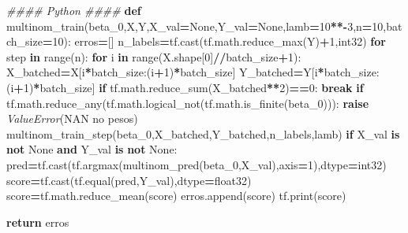 \documentclass[
]{article}
\newenvironment{Shaded}{\begin{snugshade}}{\end{snugshade}}
\newcommand{\BuiltInTok}[1]{#1}
\newcommand{\CommentTok}[1]{\textcolor[rgb]{0.56,0.35,0.01}{\textit{#1}}}
\newcommand{\ControlFlowTok}[1]{\textcolor[rgb]{0.13,0.29,0.53}{\textbf{#1}}}
\newcommand{\DecValTok}[1]{\textcolor[rgb]{0.00,0.00,0.81}{#1}}
\newcommand{\KeywordTok}[1]{\textcolor[rgb]{0.13,0.29,0.53}{\textbf{#1}}}
\newcommand{\NormalTok}[1]{#1}
\newcommand{\OperatorTok}[1]{\textcolor[rgb]{0.81,0.36,0.00}{\textbf{#1}}}
\newcommand{\PreprocessorTok}[1]{\textcolor[rgb]{0.56,0.35,0.01}{\textit{#1}}}
\newcommand{\StringTok}[1]{\textcolor[rgb]{0.31,0.60,0.02}{#1}}
\newcommand{\VariableTok}[1]{\textcolor[rgb]{0.00,0.00,0.00}{#1}}
\begin{document}
\begin{Shaded}
\begin{Highlighting}[]
\CommentTok{\#\#\#\# Python \#\#\#\#}
\KeywordTok{def}\NormalTok{ multinom\_train(beta\_0,X,Y,X\_val}\OperatorTok{=}\VariableTok{None}\NormalTok{,Y\_val}\OperatorTok{=}\VariableTok{None}\NormalTok{,lamb}\OperatorTok{=}\DecValTok{10}\OperatorTok{**{-}}\DecValTok{3}\NormalTok{,n}\OperatorTok{=}\DecValTok{10}\NormalTok{,batch\_size}\OperatorTok{=}\DecValTok{10}\NormalTok{):}
\NormalTok{  erros}\OperatorTok{=}\NormalTok{[]}
\NormalTok{  n\_labels}\OperatorTok{=}\NormalTok{tf.cast(tf.math.reduce\_max(Y)}\OperatorTok{+}\DecValTok{1}\NormalTok{,}\StringTok{\textquotesingle{}int32\textquotesingle{}}\NormalTok{)}
  \ControlFlowTok{for}\NormalTok{ step }\KeywordTok{in} \BuiltInTok{range}\NormalTok{(n):}
    \ControlFlowTok{for}\NormalTok{ i }\KeywordTok{in} \BuiltInTok{range}\NormalTok{(X.shape[}\DecValTok{0}\NormalTok{]}\OperatorTok{//}\NormalTok{batch\_size}\OperatorTok{+}\DecValTok{1}\NormalTok{):}
\NormalTok{      X\_batched}\OperatorTok{=}\NormalTok{X[i}\OperatorTok{*}\NormalTok{batch\_size:(i}\OperatorTok{+}\DecValTok{1}\NormalTok{)}\OperatorTok{*}\NormalTok{batch\_size]}
\NormalTok{      Y\_batched}\OperatorTok{=}\NormalTok{Y[i}\OperatorTok{*}\NormalTok{batch\_size:(i}\OperatorTok{+}\DecValTok{1}\NormalTok{)}\OperatorTok{*}\NormalTok{batch\_size]}
      \ControlFlowTok{if}\NormalTok{ tf.math.reduce\_sum(X\_batched}\OperatorTok{**}\DecValTok{2}\NormalTok{)}\OperatorTok{==}\DecValTok{0}\NormalTok{:}
        \ControlFlowTok{break}
      \ControlFlowTok{if}\NormalTok{ tf.math.reduce\_any(tf.math.logical\_not(tf.math.is\_finite(beta\_0))):}
        \ControlFlowTok{raise} \PreprocessorTok{ValueError}\NormalTok{(}\StringTok{\textquotesingle{}NAN no pesos\textquotesingle{}}\NormalTok{)}
\NormalTok{      multinom\_train\_step(beta\_0,X\_batched,Y\_batched,n\_labels,lamb)}
    \ControlFlowTok{if}\NormalTok{ X\_val }\KeywordTok{is} \KeywordTok{not} \VariableTok{None} \KeywordTok{and}\NormalTok{ Y\_val }\KeywordTok{is} \KeywordTok{not} \VariableTok{None}\NormalTok{:}
\NormalTok{      pred}\OperatorTok{=}\NormalTok{tf.cast(tf.argmax(multinom\_pred(beta\_0,X\_val),axis}\OperatorTok{=}\DecValTok{1}\NormalTok{),dtype}\OperatorTok{=}\StringTok{\textquotesingle{}int32\textquotesingle{}}\NormalTok{)}
\NormalTok{      score}\OperatorTok{=}\NormalTok{tf.cast(tf.equal(pred,Y\_val),dtype}\OperatorTok{=}\StringTok{\textquotesingle{}float32\textquotesingle{}}\NormalTok{)}
\NormalTok{      score}\OperatorTok{=}\NormalTok{tf.math.reduce\_mean(score)}
\NormalTok{      erros.append(score)}
\NormalTok{      tf.}\BuiltInTok{print}\NormalTok{(score)}
    
  \ControlFlowTok{return}\NormalTok{ erros}
\end{Highlighting}
\end{Shaded}
\end{document}
